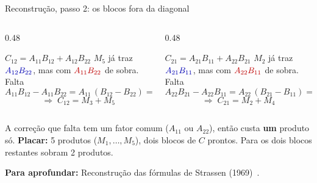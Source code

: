 \documentclass[aspectratio=169,xcolor=table]{beamer}
\newcommand{\fonte}[1]{%
  \vfill
  {\tiny\color{gray!55!black}\textbf{Para aprofundar:} #1\par}%
}
\newcommand{\util}[1]{\textcolor{blue!70!black}{#1}}
\newcommand{\lixo}[1]{\textcolor{red!75!black}{#1}}
\begin{document}
\begin{frame}{Reconstrução, passo 2: os blocos fora da diagonal}
  \begin{columns}[T]
    \begin{column}{0.48\textwidth}
      \begin{block}{$C_{12} = A_{11}B_{12} + A_{12}B_{22}$}
        \scriptsize
        $M_5$ já traz $\util{A_{12}B_{22}}$, mas com $\lixo{A_{11}B_{22}}$ de sobra. Falta
        \[
          A_{11}B_{12} - A_{11}B_{22} = A_{11}\,(B_{12}-B_{22}) = M_3
        \]
        \vspace{-8pt}
        \[
          \Rightarrow\; C_{12} = M_3 + M_5
        \]
      \end{block}
    \end{column}
    \begin{column}{0.48\textwidth}
      \begin{block}{$C_{21} = A_{21}B_{11} + A_{22}B_{21}$}
        \scriptsize
        $M_2$ já traz $\util{A_{21}B_{11}}$, mas com $\lixo{A_{22}B_{11}}$ de sobra. Falta
        \[
          A_{22}B_{21} - A_{22}B_{11} = A_{22}\,(B_{21}-B_{11}) = M_4
        \]
        \vspace{-8pt}
        \[
          \Rightarrow\; C_{21} = M_2 + M_4
        \]
      \end{block}
    \end{column}
  \end{columns}
  \medskip
  \scriptsize
  A correção que falta tem um fator comum ($A_{11}$ ou $A_{22}$), então custa
  \textbf{um} produto só.
  \textbf{Placar:} 5 produtos ($M_1,\dots,M_5$), dois blocos de $C$ prontos.
  Para os dois blocos restantes sobram 2 produtos.
  \fonte{Reconstrução das fórmulas de Strassen (1969)~\cite{strassen1969gaussian}.}
\end{frame}
\end{document}
